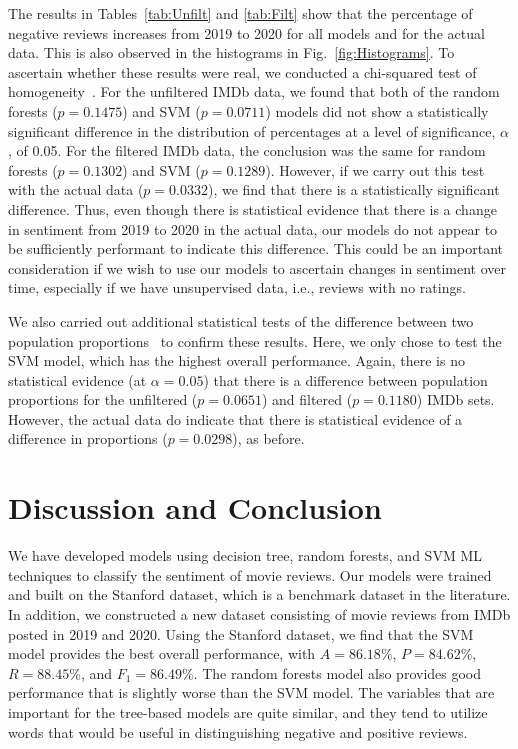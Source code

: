 \documentclass[conference]{IEEEtran}
\begin{document}
The results in Tables~\ref{tab:Unfilt} and \ref{tab:Filt} show that the percentage of negative reviews increases from 2019 to 2020 for all models and for the actual data. This is also observed in the histograms in Fig.~\ref{fig:Histograms}. To ascertain whether these results were real, we conducted a chi-squared test of homogeneity~\cite{ref:Ott1}. For the unfiltered IMDb data, we found that both of the random forests (\(p = 0.1475\)) and SVM (\(p = 0.0711\)) models did not show a statistically significant difference in the distribution of percentages at a level of significance, \(\alpha\), of 0.05. For the filtered IMDb data, the conclusion was the same for random forests (\(p = 0.1302\)) and SVM (\(p = 0.1289\)). However, if we carry out this test with the actual data (\(p = 0.0332\)), we find that there is a statistically significant difference. Thus, even though there is statistical evidence that there is a change in sentiment from 2019 to 2020 in the actual data, our models do not appear to be sufficiently performant to indicate this difference. This could be an important consideration if we wish to use our models to ascertain changes in sentiment over time, especially if we have unsupervised data, i.e., reviews with no ratings.

We also carried out additional statistical tests of the difference between two population proportions~\cite{ref:Ott2} to confirm these results. Here, we only chose to test the SVM model, which has the highest overall performance. Again, there is no statistical evidence (at \(\alpha = 0.05\)) that there is a difference between population proportions for the unfiltered (\(p = 0.0651\)) and filtered (\(p = 0.1180\)) IMDb sets. However, the actual data do indicate that there is statistical evidence of a difference in proportions (\(p = 0.0298\)), as before.

\section{Discussion and Conclusion}\label{sec:Conclusion}
We have developed models using decision tree, random forests, and SVM ML techniques to classify the sentiment of movie reviews. Our models were trained and built on the Stanford dataset, which is a benchmark dataset in the literature. In addition, we constructed a new dataset consisting of movie reviews from IMDb posted in 2019 and 2020. Using the Stanford dataset, we find that the SVM model provides the best overall performance, with \(A = 86.18\%\), \(P = 84.62\%\), \(R = 88.45\%\), and \(F_1 = 86.49\%\). The random forests model also provides good performance that is slightly worse than the SVM model. The variables that are important for the tree-based models are quite similar, and they tend to utilize words that would be useful in distinguishing negative and positive reviews.
\end{document}
